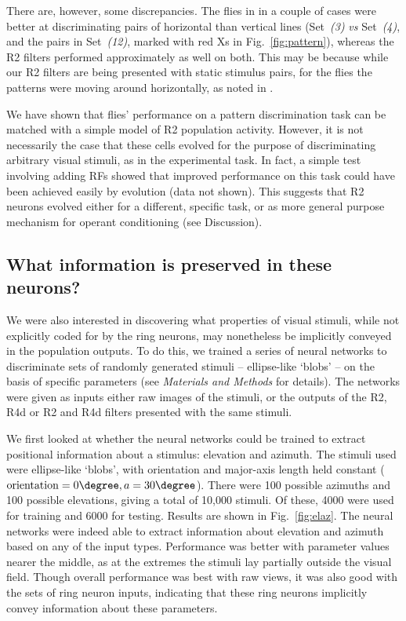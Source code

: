 There are, however, some discrepancies.
The flies in \cite{Ernst1999} in a couple of cases were better at discriminating pairs of horizontal than vertical lines (Set~\emph{(3)} \emph{vs} Set~\emph{(4)}, and the pairs in Set~\emph{(12)}, marked with red Xs in Fig.~\ref{fig:pattern}), whereas the R2 filters performed approximately as well on both.
This may be because while our R2 filters are being presented with static stimulus pairs, for the flies the patterns were moving around horizontally, as noted in \cite{Ernst1999}.

We have shown that flies' performance on a pattern discrimination task can be matched with a simple model of R2 population activity.
However, it is not necessarily the case that these cells evolved for the purpose of discriminating arbitrary visual stimuli, as in the experimental task.
In fact, a simple test involving adding RFs showed that improved performance on this task could have been achieved easily by evolution (data not shown).
This suggests that R2 neurons evolved either for a different, specific task, or as more general purpose mechanism for operant conditioning (see Discussion).

\subsection{What information is preserved in these neurons?}
We were also interested in discovering what properties of visual stimuli, while not explicitly coded for by the ring neurons, may nonetheless be implicitly conveyed in the population outputs.
To do this, we trained a series of neural networks to discriminate sets of randomly generated stimuli -- ellipse-like `blobs' -- on the basis of specific parameters (see \emph{Materials and Methods} for details).
The networks were given as inputs either raw images of the stimuli, or the outputs of the R2, R4d or R2 and R4d filters presented with the same stimuli.

We first looked at whether the neural networks could be trained to extract positional information about a stimulus: elevation and azimuth.
The stimuli used were ellipse-like `blobs', with orientation and major-axis length held constant ($\mathrm{orientation} = 0\degree, a = 30\degree$).
There were 100 possible azimuths and 100 possible elevations, giving a total of 10,000 stimuli.
Of these, 4000 were used for training and 6000 for testing.
Results are shown in Fig.~\ref{fig:elaz}.
The neural networks were indeed able to extract information about elevation and azimuth based on any of the input types.
Performance was better with parameter values nearer the middle, as at the extremes the stimuli lay partially outside the visual field.
Though overall performance was best with raw views, it was also good with the sets of ring neuron inputs, indicating that these ring neurons implicitly convey information about these parameters.

